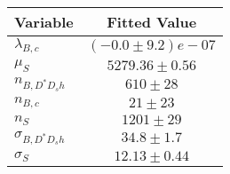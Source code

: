 \begin{tabular}[t]{lc}
\hline
Variable &Fitted Value\\
\hline\hline
$\lambda_{B,c}$&$(-0.0\pm9.2)e-07$\\
\hline
$\mu_S$&$5279.36\pm0.56$\\
\hline
$n_{B, D^* D_s h}$&$610\pm28$\\
\hline
$n_{B,c}$&$21\pm23$\\
\hline
$n_S$&$1201\pm29$\\
\hline
$\sigma_{B, D^* D_s h}$&$34.8\pm1.7$\\
\hline
$\sigma_S$&$12.13\pm0.44$\\
\hline
\end{tabular}